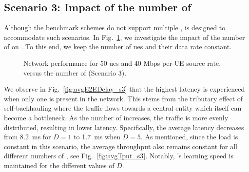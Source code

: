 \subsection{Scenario 3: Impact of the number of \donors{}}
\label{sec:multiDonors}
Although the benchmark schemes do not support multiple \donors{}, \name{} is designed to accommodate such scenarios. In Fig.~\ref{fig:avgNetPerfomance_s3}, we investigate the impact of the number of \nodes{} on \name{}. To this end, we keep the number of \glspl{ue} and their data rate constant. 
\begin{figure}
\centering
{}
  
   \caption{Network performance for $50$ \glspl{ue} and $40$ Mbps per-UE source rate, versus the number of \donors{} (Scenario 3).}
  \label{fig:avgNetPerfomance_s3}
  \vspace*{-3mm}
\end{figure}
We observe in Fig.~\ref{fig:avgE2EDelay_s3} that the highest latency is experienced when only one \donor{} is present in the network. This stems from the tributary effect of self-backhauling where the traffic flows towards a central entity which itself can become a bottleneck. As the number of \donors{} increases, the traffic is more evenly distributed, resulting in lower latency. Specifically, the average latency decreases from 8.2~ms for $D=1$ to 1.7~ms when $D=5$. As mentioned, since the load is constant in this scenario, the average throughput also remains constant for all different numbers of \donors{}, see Fig.~\ref{fig:avgTput_s3}. Notably, \name{}'s  learning speed is maintained for the different values of $D$.
